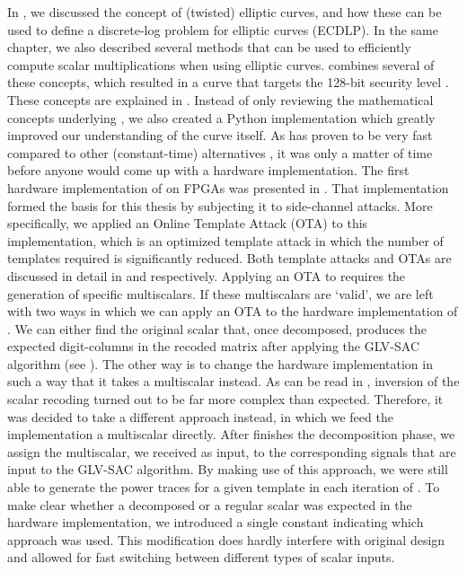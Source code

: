 In , we discussed the concept of (twisted) elliptic curves, and how these can be used to define a discrete-log problem for elliptic curves (ECDLP).
In the same chapter, we also described several methods that can be used to efficiently compute scalar multiplications when using elliptic curves.
{\fourq} combines several of these concepts, which resulted in a curve that targets the 128-bit security level \cite{costello2015fourq}.
These concepts are explained in .
Instead of only reviewing the mathematical concepts underlying {\fourq}, we also created a Python implementation which greatly improved our understanding of the curve itself. 
As {\fourq} has proven to be very fast compared to other (constant-time) alternatives \cite{costello2015fourq}, it was only a matter of time before anyone would come up with a hardware implementation.
The first hardware implementation of {\fourq} on FPGAs was presented in \cite{jarvinen2016four}.
That implementation formed the basis for this thesis by subjecting it to side-channel attacks.
More specifically, we applied an Online Template Attack (OTA) to this implementation, which is an optimized template attack in which the number of templates required is significantly reduced.
Both template attacks and OTAs are discussed in detail in  and  respectively.
Applying an OTA to {\fourq} requires the generation of specific multiscalars.
If these multiscalars are `valid', we are left with two ways in which we can apply an OTA to the hardware implementation of {\fourq}.
We can either find the original scalar that, once decomposed, produces the expected digit-columns in the recoded matrix after applying the GLV-SAC algorithm (see ). 
The other way is to change the hardware implementation in such a way that it takes a multiscalar instead.
As can be read in , inversion of the scalar recoding turned out to be far more complex than expected.
Therefore, it was decided to take a different approach instead, in which we feed the implementation a multiscalar directly.
After {\fourq} finishes the decomposition phase, we assign the multiscalar, we received as input, to the corresponding signals that are input to the GLV-SAC algorithm. 
By making use of this approach, we were still able to generate the power traces for a given template in each iteration of {\fourq}. 
To make clear whether a decomposed or a regular scalar was expected in the hardware implementation, we introduced a single constant indicating which approach was used.
This modification does hardly interfere with original design and allowed for fast switching between different types of scalar inputs.

